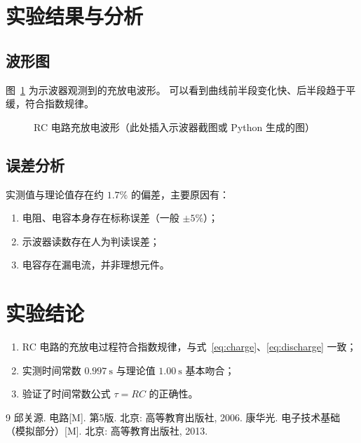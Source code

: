 \documentclass[12pt, a4paper]{ctexart}
\begin{document}
\section{实验结果与分析}

\subsection{波形图}
图~\ref{fig:wave} 为示波器观测到的充放电波形。
可以看到曲线前半段变化快、后半段趋于平缓，符合指数规律。

\begin{figure}[H]
\centering
\caption{RC 电路充放电波形（此处插入示波器截图或 Python 生成的图）}
\label{fig:wave}
\end{figure}

\subsection{误差分析}
实测值与理论值存在约 $1.7\%$ 的偏差，主要原因有：

\begin{enumerate}
    \item 电阻、电容本身存在标称误差（一般 $\pm 5\%$）；
    \item 示波器读数存在人为判读误差；
    \item 电容存在漏电流，并非理想元件。
\end{enumerate}

\section{实验结论}
\begin{enumerate}
    \item RC 电路的充放电过程符合指数规律，与式~\eqref{eq:charge}、\eqref{eq:discharge} 一致；
    \item 实测时间常数 $0.997\ \mathrm{s}$ 与理论值 $1.00\ \mathrm{s}$ 基本吻合；
    \item 验证了时间常数公式 $\tau = RC$ 的正确性。
\end{enumerate}

\begin{thebibliography}{9}
 邱关源. 电路[M]. 第5版. 北京: 高等教育出版社, 2006.
 康华光. 电子技术基础（模拟部分）[M]. 北京: 高等教育出版社, 2013.
\end{thebibliography}
\end{document}
